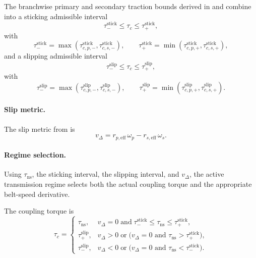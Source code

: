 \documentclass[11pt]{article}
\numberwithin{equation}{section}
\begin{document}
The branchwise primary and secondary traction bounds derived in
 and 
combine into a sticking admissible interval
\begin{equation}
\tau_-^{\mathrm{stick}}
\le
\tau_c
\le
\tau_+^{\mathrm{stick}},
\label{eq:tau_pm_stick_complete}
\end{equation}
with
\begin{equation}
\tau_-^{\mathrm{stick}}
=
\max\!\left(
\tau_{c,p,-}^{\mathrm{stick}},
\tau_{c,s,-}^{\mathrm{stick}}
\right),
\qquad
\tau_+^{\mathrm{stick}}
=
\min\!\left(
\tau_{c,p,+}^{\mathrm{stick}},
\tau_{c,s,+}^{\mathrm{stick}}
\right),
\label{eq:tau_pm_stick_complete_explicit}
\end{equation}
and a slipping admissible interval
\begin{equation}
\tau_-^{\mathrm{slip}}
\le
\tau_c
\le
\tau_+^{\mathrm{slip}},
\label{eq:tau_pm_slip_complete}
\end{equation}
with
\begin{equation}
\tau_-^{\mathrm{slip}}
=
\max\!\left(
\tau_{c,p,-}^{\mathrm{slip}},
\tau_{c,s,-}^{\mathrm{slip}}
\right),
\qquad
\tau_+^{\mathrm{slip}}
=
\min\!\left(
\tau_{c,p,+}^{\mathrm{slip}},
\tau_{c,s,+}^{\mathrm{slip}}
\right).
\label{eq:tau_pm_slip_complete_explicit}
\end{equation}

\paragraph{Slip metric.}

The slip metric from  is
\begin{equation}
v_{\Delta}
=
r_{p,\mathrm{eff}}\,\omega_p
-
r_{s,\mathrm{eff}}\,\omega_s.
\label{eq:v_delta_complete}
\end{equation}

\paragraph{Regime selection.}

Using \(\tau_{\mathrm{ns}}\), the sticking interval, the slipping interval,
and \(v_\Delta\), the active transmission regime selects both the actual
coupling torque and the appropriate belt-speed derivative.

The coupling torque is
\begin{equation}
\tau_c =
\begin{cases}
\tau_{\mathrm{ns}},
&
v_{\Delta}=0
\;\text{and}\;
\tau_-^{\mathrm{stick}} \le \tau_{\mathrm{ns}} \le \tau_+^{\mathrm{stick}},
\\[10pt]
\tau_+^{\mathrm{slip}},
&
v_{\Delta}>0
\;\text{or}\;
\bigl(v_{\Delta}=0 \text{ and } \tau_{\mathrm{ns}}>\tau_+^{\mathrm{stick}}\bigr),
\\[10pt]
\tau_-^{\mathrm{slip}},
&
v_{\Delta}<0
\;\text{or}\;
\bigl(v_{\Delta}=0 \text{ and } \tau_{\mathrm{ns}}<\tau_-^{\mathrm{stick}}\bigr).
\end{cases}
\label{eq:tau_c_complete}
\end{equation}
\end{document}
